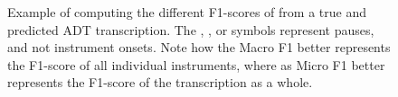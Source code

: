 \begin{figure}[H]
    \centering
    \hspace*{-0.5cm}
    
    \caption{Example of computing the different F1-scores of from a true and predicted \gls{ADT} transcription. The \HaPa, \ViPa, or \AcPa symbols represent pauses, and not instrument onsets. Note how the Macro F1 better represents the F1-score of all individual instruments, where as Micro F1 better represents the F1-score of the transcription as a whole.}
    \label{F1Figure}
\end{figure}